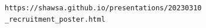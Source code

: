 \documentclass[landscape,final]{baposter}
\begin{document}
\begin{poster}
{\texttt{https://shawsa.github.io/presentations/20230310} \texttt{\_recruitment\_poster.html}
	
}

\end{poster}
\end{document}
